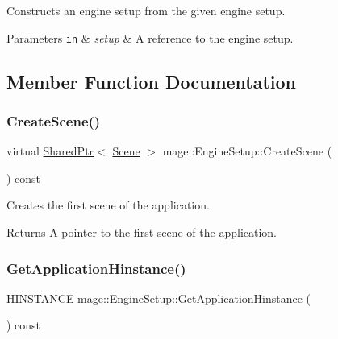 Constructs an engine setup from the given engine setup.


\begin{DoxyParams}[1]{Parameters}
\mbox{\tt in}  & {\em setup} & A reference to the engine setup. \\
\hline
\end{DoxyParams}


\subsection{Member Function Documentation}
\hypertarget{structmage_1_1_engine_setup_a004fce6a741fc68c8f6feed546d9f220}{}\label{structmage_1_1_engine_setup_a004fce6a741fc68c8f6feed546d9f220} 
\subsubsection{\texorpdfstring{Create\+Scene()}{CreateScene()}}
{\footnotesize\ttfamily virtual \hyperlink{namespacemage_a1e01ae66713838a7a67d30e44c67703e}{Shared\+Ptr}$<$ \hyperlink{classmage_1_1_scene}{Scene} $>$ mage\+::\+Engine\+Setup\+::\+Create\+Scene (\begin{DoxyParamCaption}{ }\end{DoxyParamCaption}) const\hspace{0.3cm}{\ttfamily [pure virtual]}}

Creates the first scene of the application.

\begin{DoxyReturn}{Returns}
A pointer to the first scene of the application. 
\end{DoxyReturn}
\hypertarget{structmage_1_1_engine_setup_a2d9220896adfe924ac72165b4e2b13cf}{}\label{structmage_1_1_engine_setup_a2d9220896adfe924ac72165b4e2b13cf} 
\subsubsection{\texorpdfstring{Get\+Application\+Hinstance()}{GetApplicationHinstance()}}
{\footnotesize\ttfamily H\+I\+N\+S\+T\+A\+N\+CE mage\+::\+Engine\+Setup\+::\+Get\+Application\+Hinstance (\begin{DoxyParamCaption}{ }\end{DoxyParamCaption}) const}

